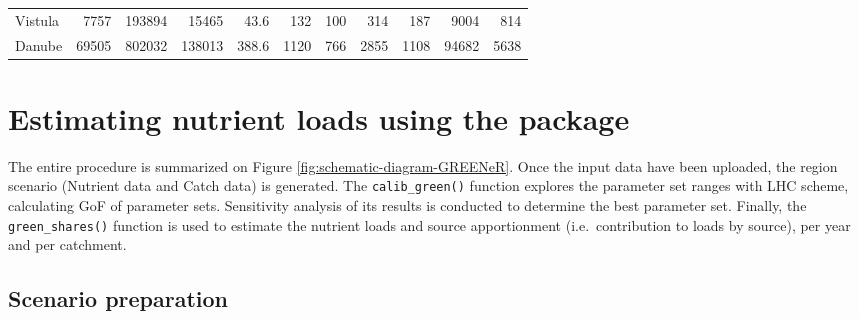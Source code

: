 \begin{table}[htbp]
\begin{tabular}{@{}lrrrrrrrrrr@{}}
Vistula                                              & 7757                                                                       & 193894                                                                   & 15465                                                                              & 43.6                                                                   & 132                                  & 100                                  & 314                                      & 187                                      & 9004                                     & 814                                     \\
Danube                                               & 69505                                                                      & 802032                                                                   & 138013                                                                             & 388.6                                                                  & 1120                                 & 766                                  & 2855                                     & 1108                                     & 94682                                    & 5638                                    \\ \bottomrule
\end{tabular}
\end{table}

\hypertarget{estimating-nutrient-loads-using-the-package}{%
\section{\texorpdfstring{Estimating nutrient loads using the  package}{Estimating nutrient loads using the  package}}\label{estimating-nutrient-loads-using-the-package}}

The entire procedure is summarized on Figure \ref{fig:schematic-diagram-GREENeR}. Once the input data have been uploaded, the region scenario (Nutrient data and Catch data) is generated. The \texttt{calib\_green()} function explores the parameter set ranges with LHC scheme, calculating GoF of parameter sets. Sensitivity analysis of its results is conducted to determine the best parameter set. Finally, the \texttt{green\_shares()} function is used to estimate the nutrient loads and source apportionment (i.e.~contribution to loads by source), per year and per catchment.

\hypertarget{scenario-preparation}{%
\subsection{Scenario preparation}\label{scenario-preparation}}

